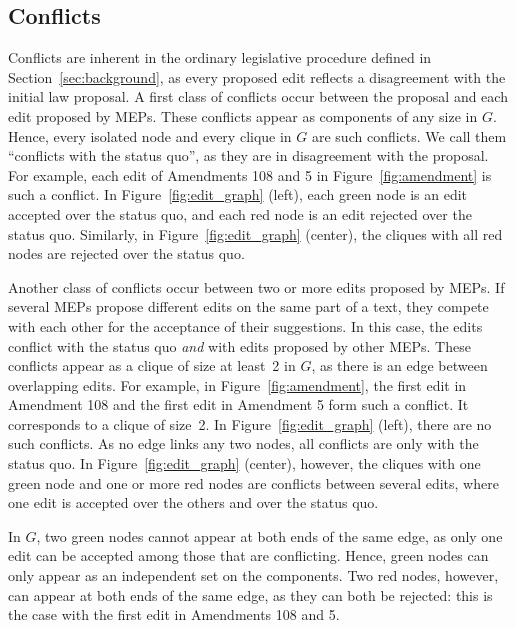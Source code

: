 \subsection{Conflicts}

Conflicts are inherent in the ordinary legislative procedure defined in Section~\ref{sec:background}, as every proposed edit reflects a disagreement with the initial law proposal.
A first class of conflicts occur between the proposal and each edit proposed by MEPs.
These conflicts appear as components of any size in $G$.
Hence, every isolated node and every clique in $G$ are such conflicts.
We call them ``conflicts with the status quo'', as they are in disagreement with the proposal.
For example, each edit of Amendments 108 and 5 in Figure~\ref{fig:amendment} is such a conflict.
In Figure~\ref{fig:edit_graph} (left), each green node is an edit accepted over the status quo, and each red node is an edit rejected over the status quo.
Similarly, in Figure~\ref{fig:edit_graph} (center), the cliques with all red nodes are rejected over the status quo.

Another class of conflicts occur between two or more edits proposed by MEPs.
If several MEPs propose different edits on the same part of a text, they compete with each other for the acceptance of their suggestions.
In this case, the edits conflict with the status quo \textit{and} with edits proposed by other MEPs.
These conflicts appear as a clique of size at least~2 in $G$, as there is an edge between overlapping edits.
For example, in Figure~\ref{fig:amendment}, the first edit in Amendment 108 and the first edit in Amendment 5 form such a conflict.
It corresponds to a clique of size~2.
In Figure~\ref{fig:edit_graph} (left), there are no such conflicts.
As no edge links any two nodes, all conflicts are only with the status quo.
In Figure~\ref{fig:edit_graph} (center), however, the cliques with one green node and one or more red nodes are conflicts between several edits, where one edit is accepted over the others and over the status quo.

In $G$, two green nodes cannot appear at both ends of the same edge, as only one edit can be accepted among those that are conflicting.
Hence, green nodes can only appear as an independent set on the components.
Two red nodes, however, can appear at both ends of the same edge, as they can both be rejected: this is the case with the first edit in Amendments 108 and 5.

